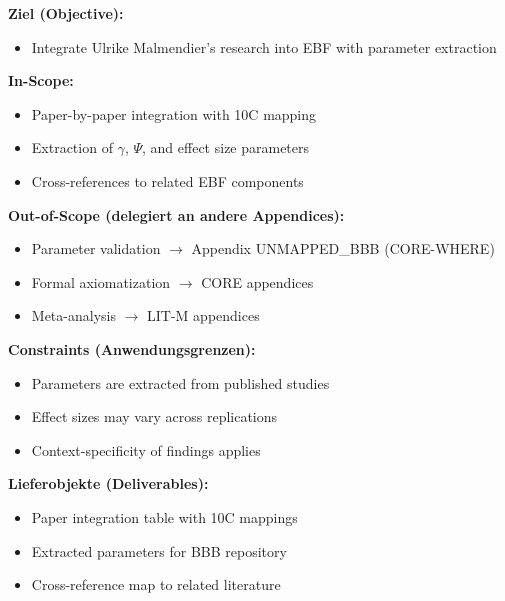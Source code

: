 
\begin{tcolorbox}[
    colback=orange!5!white,
    colframe=orange!75!black,
    title={\textbf{Appendix Scope: Ziel / In-Scope / Out-of-Scope / Constraints}},
    fonttitle=\bfseries
]

\textbf{Ziel (Objective):}
\begin{itemize}[nosep]
    \item Integrate Ulrike Malmendier's research into EBF with parameter extraction
\end{itemize}

\textbf{In-Scope:}
\begin{itemize}[nosep]
    \item Paper-by-paper integration with 10C mapping
    \item Extraction of $\gamma$, $\Psi$, and effect size parameters
    \item Cross-references to related EBF components
\end{itemize}

\textbf{Out-of-Scope (delegiert an andere Appendices):}
\begin{itemize}[nosep]
    \item Parameter validation $\rightarrow$ Appendix UNMAPPED_BBB (CORE-WHERE)
    \item Formal axiomatization $\rightarrow$ CORE appendices
    \item Meta-analysis $\rightarrow$ LIT-M appendices
\end{itemize}

\textbf{Constraints (Anwendungsgrenzen):}
\begin{itemize}[nosep]
    \item Parameters are extracted from published studies
    \item Effect sizes may vary across replications
    \item Context-specificity of findings applies
\end{itemize}

\textbf{Lieferobjekte (Deliverables):}
\begin{itemize}[nosep]
    \item Paper integration table with 10C mappings
    \item Extracted parameters for BBB repository
    \item Cross-reference map to related literature
\end{itemize}

\end{tcolorbox}

